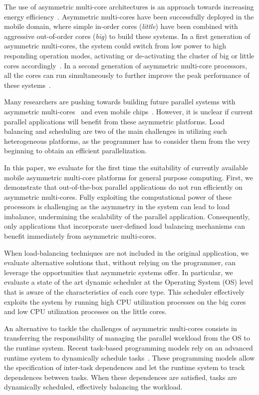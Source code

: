 The use of asymmetric multi-core architectures is an approach towards increasing energy efficiency~\cite{Kumar:ISCA2004,Balakrishnan:ISCA2005}. Asymmetric multi-cores have been successfully deployed in the mobile domain, where simple in-order cores (\emph{little}) have been combined with aggressive out-of-order cores (\emph{big}) to build these systems. In a first generation of asymmetric multi-cores, the system could switch from low power to high responding operation modes, activating or de-activating the cluster of big or little cores accordingly~\cite{ARM}. In a second generation of asymmetric multi-core processors, all the cores can run simultaneously to further improve the peak performance of these systems~\cite{samsung}.

Many researchers are pushing towards building future parallel systems with asymmetric multi-cores~\cite{Suleman:APLOS2009,Fedorova2009, Greenhalgh2011, Joao:ASPLOS2012,Joao:ISCA2013} and even mobile chips~\cite{ARM4HPC_SC13}. However, it is unclear if current parallel applications will benefit from these asymmetric platforms. Load balancing and scheduling are two of the main challenges in utilizing such heterogeneous platforms, as the programmer has to consider them from the very beginning to obtain an efficient parallelization.

In this paper, we evaluate for the first time the suitability of currently available mobile asymmetric multi-core platforms for general purpose computing. First, we demonstrate that out-of-the-box parallel applications do not run efficiently on asymmetric multi-cores. Fully exploiting the computational power of these processors is challenging as the asymmetry in the system can lead to load imbalance, undermining the scalability of the parallel application. Consequently, only applications that incorporate user-defined load balancing mechanisms can benefit immediately from asymmetric multi-cores.

When load-balancing techniques are not included in the original application, we evaluate alternative solutions that, without relying on the programmer, can leverage the opportunities that asymmetric systems offer. In particular, we evaluate a state of the art dynamic scheduler at the Operating System (OS) level that is aware of the characteristics of each core type. This scheduler effectively exploits the system by running high CPU utilization processes on the big cores and low CPU utilization processes on the little cores.

An alternative to tackle the challenges of asymmetric multi-cores consists in transferring the responsibility of managing the parallel workload from the OS to the runtime system. Recent task-based programming models rely on an advanced runtime system to dynamically schedule tasks~\cite{Ayguade:TPDS2009, OpenMP4.0:Manual2013, OmpSs_PPL11, Zuckerman:EXADAPT2011, Bauer.2012.SC, Vandierendonck:PACT2011, Vandierendonck:Hyperq}. These programming models allow the specification of inter-task dependences and let the runtime system to track dependences between tasks. When these dependences are satisfied, tasks are dynamically scheduled, effectively balancing the workload.

